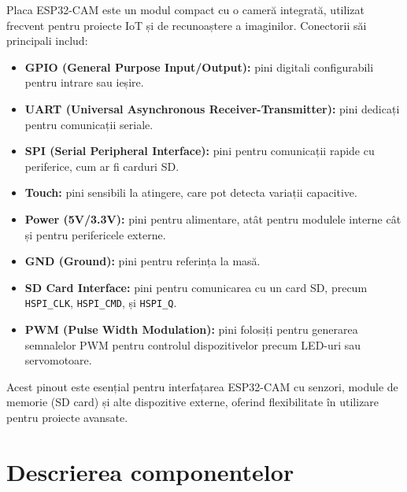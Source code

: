 \documentclass{report}
\begin{document}
\newpage
\vspace*{1cm}
Placa ESP32-CAM este un modul compact cu o cameră integrată, utilizat frecvent pentru proiecte IoT și de recunoaștere a imaginilor. Conectorii săi principali includ:

\begin{itemize}
    \item \textbf{GPIO (General Purpose Input/Output):} pini digitali configurabili pentru intrare sau ieșire.
    \item \textbf{UART (Universal Asynchronous Receiver-Transmitter):} pini dedicați pentru comunicații seriale.
    \item \textbf{SPI (Serial Peripheral Interface):} pini pentru comunicații rapide cu periferice, cum ar fi carduri SD.
    \item \textbf{Touch:} pini sensibili la atingere, care pot detecta variații capacitive.
    \item \textbf{Power (5V/3.3V):} pini pentru alimentare, atât pentru modulele interne cât și pentru perifericele externe.
    \item \textbf{GND (Ground):} pini pentru referința la masă.
    \item \textbf{SD Card Interface:} pini pentru comunicarea cu un card SD, precum \texttt{HSPI\_CLK}, \texttt{HSPI\_CMD}, și \texttt{HSPI\_Q}.
    \item \textbf{PWM (Pulse Width Modulation):} pini folosiți pentru generarea semnalelor PWM pentru controlul dispozitivelor precum LED-uri sau servomotoare.
\end{itemize}

Acest pinout este esențial pentru interfațarea ESP32-CAM cu senzori, module de memorie (SD card) și alte dispozitive externe, oferind flexibilitate în utilizare pentru proiecte avansate.




\chapter{Descrierea componentelor}
\end{document}
